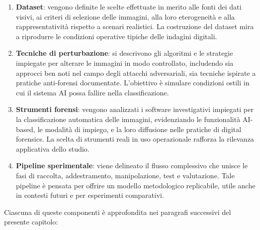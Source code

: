 \begin{enumerate}
\item \textbf{Dataset}: vengono definite le scelte effettuate in merito alle fonti dei dati visivi, ai criteri di selezione delle immagini, alla loro eterogeneità e alla rappresentatività rispetto a scenari realistici. La costruzione del dataset mira a riprodurre le condizioni operative tipiche delle indagini digitali.
\item \textbf{Tecniche di perturbazione}: si descrivono gli algoritmi e le strategie impiegate per alterare le immagini in modo controllato, includendo sia approcci ben noti nel campo degli attacchi adversariali, sia tecniche ispirate a pratiche anti-forensi documentate. L'obiettivo è simulare condizioni ostili in cui il sistema AI possa fallire nella classificazione.
\item \textbf{Strumenti forensi}: vengono analizzati i software investigativi impiegati per la classificazione automatica delle immagini, evidenziando le funzionalità AI-based, le modalità di impiego, e la loro diffusione nelle pratiche di digital forensics. La scelta di strumenti reali in uso operazionale rafforza la rilevanza applicativa dello studio.
\item \textbf{Pipeline sperimentale}: viene delineato il flusso complessivo che unisce le fasi di raccolta, addestramento, manipolazione, test e valutazione. Tale pipeline è pensata per offrire un modello metodologico replicabile, utile anche in contesti futuri e per esperimenti comparativi.
\end{enumerate}

Ciascuna di queste componenti è approfondita nei paragrafi successivi del presente capitolo:

